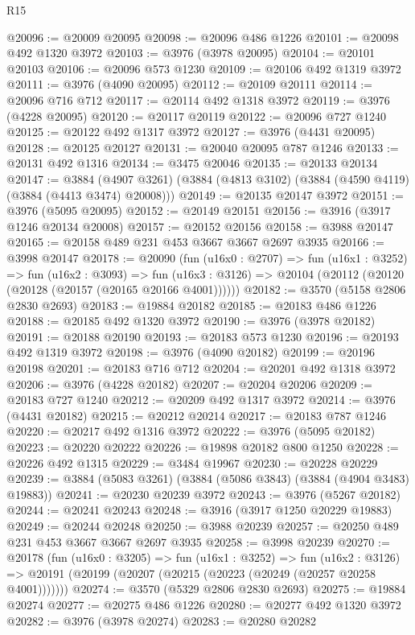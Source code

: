 \begin{lexlean}{R15}
\begin{coremodule}
@20096 := @20009 @20095
@20098 := @20096 @486 @1226
@20101 := @20098 @492 @1320 @3972
@20103 := @3976 (@3978 @20095)
@20104 := @20101 @20103
@20106 := @20096 @573 @1230
@20109 := @20106 @492 @1319 @3972
@20111 := @3976 (@4090 @20095)
@20112 := @20109 @20111
@20114 := @20096 @716 @712
@20117 := @20114 @492 @1318 @3972
@20119 := @3976 (@4228 @20095)
@20120 := @20117 @20119
@20122 := @20096 @727 @1240
@20125 := @20122 @492 @1317 @3972
@20127 := @3976 (@4431 @20095)
@20128 := @20125 @20127
@20131 := @20040 @20095 @787 @1246
@20133 := @20131 @492 @1316
@20134 := @3475 @20046
@20135 := @20133 @20134
@20147 := @3884
    (@4907 @3261)
    (@3884 (@4813 @3102) (@3884 (@4590 @4119) (@3884 (@4413 @3474) @20008)))
@20149 := @20135 @20147 @3972
@20151 := @3976 (@5095 @20095)
@20152 := @20149 @20151
@20156 := @3916 (@3917 @1246 @20134 @20008)
@20157 := @20152 @20156
@20158 := @3988 @20147
@20165 := @20158 @489 @231 @453 @3667 @3667 @2697 @3935
@20166 := @3998 @20147
@20178 := @20090
    (fun (u16x0 : @2707) =>
    fun (u16x1 : @3252) =>
    fun (u16x2 : @3093) =>
    fun (u16x3 : @3126) => @20104 (@20112 (@20120 (@20128 (@20157 (@20165 @20166 @4001))))))
@20182 := @3570 (@5158 @2806 @2830 @2693)
@20183 := @19884 @20182
@20185 := @20183 @486 @1226
@20188 := @20185 @492 @1320 @3972
@20190 := @3976 (@3978 @20182)
@20191 := @20188 @20190
@20193 := @20183 @573 @1230
@20196 := @20193 @492 @1319 @3972
@20198 := @3976 (@4090 @20182)
@20199 := @20196 @20198
@20201 := @20183 @716 @712
@20204 := @20201 @492 @1318 @3972
@20206 := @3976 (@4228 @20182)
@20207 := @20204 @20206
@20209 := @20183 @727 @1240
@20212 := @20209 @492 @1317 @3972
@20214 := @3976 (@4431 @20182)
@20215 := @20212 @20214
@20217 := @20183 @787 @1246
@20220 := @20217 @492 @1316 @3972
@20222 := @3976 (@5095 @20182)
@20223 := @20220 @20222
@20226 := @19898 @20182 @800 @1250
@20228 := @20226 @492 @1315
@20229 := @3484 @19967
@20230 := @20228 @20229
@20239 := @3884 (@5083 @3261) (@3884 (@5086 @3843) (@3884 (@4904 @3483) @19883))
@20241 := @20230 @20239 @3972
@20243 := @3976 (@5267 @20182)
@20244 := @20241 @20243
@20248 := @3916 (@3917 @1250 @20229 @19883)
@20249 := @20244 @20248
@20250 := @3988 @20239
@20257 := @20250 @489 @231 @453 @3667 @3667 @2697 @3935
@20258 := @3998 @20239
@20270 := @20178
    (fun (u16x0 : @3205) =>
    fun (u16x1 : @3252) =>
    fun (u16x2 : @3126) =>
    @20191 (@20199 (@20207 (@20215 (@20223 (@20249 (@20257 @20258 @4001)))))))
@20274 := @3570 (@5329 @2806 @2830 @2693)
@20275 := @19884 @20274
@20277 := @20275 @486 @1226
@20280 := @20277 @492 @1320 @3972
@20282 := @3976 (@3978 @20274)
@20283 := @20280 @20282

\end{coremodule}
\end{lexlean}
